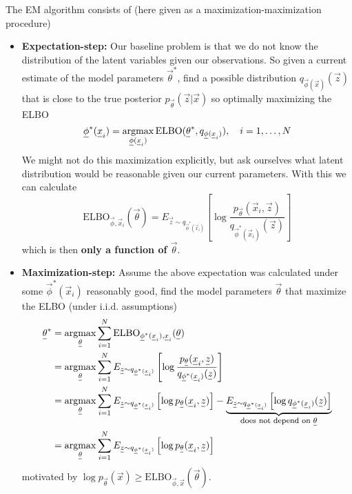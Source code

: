 The EM algorithm consists of (here given as a maximization-maximization procedure)
\begin{itemize}
    \item \textbf{Expectation-step:} Our baseline problem is that we do not know the distribution of the
    latent variables given our observations. So given a current estimate of the model parameters $\vec{\theta}^*$, find a possible
    distribution $q_{\vec{\phi}(\vec{x})}(\vec{z})$ that is close to the true posterior $p_{\vec{\theta}}(\vec{z} | \vec{x})$
    so optimally maximizing the ELBO
    \begin{equation}
        \vec{\phi}^*(\vec{x}_i) = \argmax_{\vec{\phi}(\vec{x}_i)} \text{ELBO}(\vec{\theta}^*, q_{\vec{\phi}(\vec{x}_i)}), \quad i = 1,\dots,N
    \end{equation}
    We might not do this maximization explicitly, but ask ourselves what latent distribution would be reasonable given our current parameters.
    With this we can calculate
    \begin{equation}
        \text{ELBO}_{\vec{\phi},\vec{x}_i}(\vec{\theta}) = E_{\vec{z} \sim q_{\vec{\phi}^*(\vec{x}_i)}} \left[ \log \frac{p_\vec{\theta}(\vec{x}_i,\vec{z})}{q_{\vec{\phi}^*(\vec{x}_i)}(\vec{z})} \right]
    \end{equation}
    which is then \textbf{only a function of $\vec{\theta}$}.
    \item \textbf{Maximization-step:} Assume the above expectation was calculated under some $\vec{\phi}^*(\vec{x}_i)$ reasonably good, find
    the model parameters $\vec{\theta}$ that maximize the ELBO (under i.i.d. assumptions)
    \begin{equation}
        \begin{aligned}    
            \vec{\theta}^* &= \argmax_{\vec{\theta}} \sum_{i = 1}^{N} \text{ELBO}_{\vec{\phi}^*(\vec{x}_i),\vec{x}_i}(\vec{\theta}) \\
                           &= \argmax_{\vec{\theta}} \sum_{i = 1}^{N} E_{\vec{z} \sim q_{\vec{\phi}^*(\vec{x}_i)}} \left[ \log \frac{p_\vec{\theta}(\vec{x}_i,\vec{z})}{q_{\vec{\phi}^*(\vec{x}_i)}(\vec{z})} \right] \\
                           &= \argmax_{\vec{\theta}} \sum_{i = 1}^{N} E_{\vec{z} \sim q_{\vec{\phi}^*(\vec{x}_i)}} \left[ \log p_\vec{\theta}(\vec{x}_i,\vec{z}) \right] - \explain{E_{\vec{z} \sim q_{\vec{\phi}^*(\vec{x}_i)}} \left[ \log q_{\vec{\phi}^*(\vec{x}_i)}(\vec{z}) \right]}{does not depend on $\vec{\theta}$} \\
                           &= \argmax_{\vec{\theta}} \sum_{i = 1}^{N} E_{\vec{z} \sim q_{\vec{\phi}^*(\vec{x}_i)}} \left[ \log p_\vec{\theta}(\vec{x}_i,\vec{z}) \right]
        \end{aligned}
    \end{equation}
    motivated by $\log p_\vec{\theta}(\vec{x}) \geq \text{ELBO}_{\vec{\phi},\vec{x}}(\vec{\theta})$.
\end{itemize}

